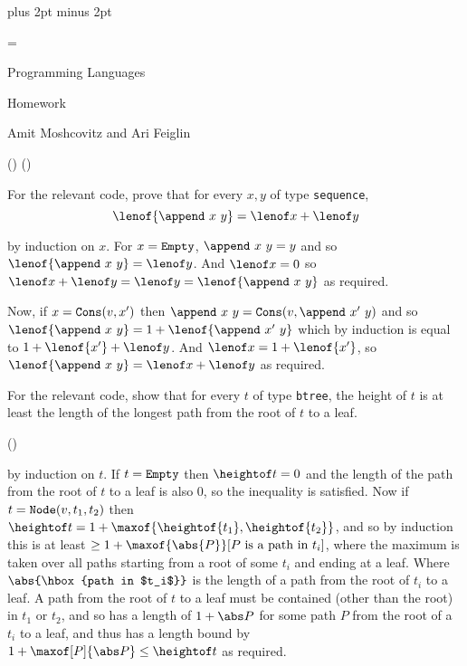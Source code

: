 

\parindent=0pt
\parskip=3pt plus 2pt minus 2pt



\footline={}

\setcounter{section}{1}


\def\printmcount{\the\counter{section}.\the\counter{math counter}}

{

    \centerline{Programming Languages}
    \smallskip
    \centerline{Homework \the{}}
    \centerline{Amit Moshcovitz and Ari Feiglin}

\eppbox}

\setscale{10pt}

({})
({})
\bexerc

    For the relevant code, prove that for every $x,y$ of type {\tt sequence},
    $$ \lenof{\append\ x\ y} = \lenof x + \lenof y $$

\eexerc

\Proof by induction on $x$.
For $x={\tt Empty}$, $\append\ x\ y=y$ and so $\lenof{\append\ x\ y}=\lenof y$.
And $\lenof x=0$ so $\lenof x+\lenof y=\lenof y=\lenof{\append\ x\ y}$ as required.

Now, if $x={\tt Cons}(v,x')$ then $\append\ x\ y={\tt Cons}(v, \append\ x'\ y)$ and so
$\lenof{\append\ x\ y}=1+\lenof{\append\ x'\ y}$ which by induction is equal to
$1+\lenof{x'}+\lenof y$.
And $\lenof x=1+\lenof{x'}$, so $\lenof{\append\ x\ y}=\lenof x+\lenof y$ as required.

\bexerc

    For the relevant code, show that for every $t$ of type {\tt btree}, the height of $t$ is at
    least the length of the longest path from the root of $t$ to a leaf.

\eexerc

({})

\Proof by induction on $t$.
If $t={\tt Empty}$ then $\heightof t=0$ and the length of the path from the root of $t$ to a leaf
is also $0$, so the inequality is satisfied.
Now if $t={\tt Node}(v,t_1,t_2)$ then $\heightof t=1+\maxof{\heightof{t_1},\heightof{t_2}}$, and so
by induction this is at least $\geq1+\maxof{\abs{P}}[\hbox{$P$ is a path in $t_i$}]$, where the
maximum is taken over all paths starting from a root of some $t_i$ and ending at a leaf.
Where $\abs{\hbox{path in $t_i$}}$ is the length of a path from the root of $t_i$ to a leaf.
A path from the root of $t$ to a leaf must be contained (other than the root) in $t_1$ or $t_2$,
and so has a length of $1+\abs P$ for some path $P$ from the root of a $t_i$ to a leaf, and thus
has a length bound by $1+\maxof[P]{\abs P}\leq\heightof t$ as required.

